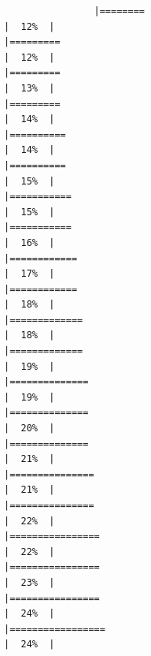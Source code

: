 \documentclass[
]{article}
\begin{document}
\begin{verbatim}
                |========                                                              |  12%  |                                                                              |=========                                                             |  12%  |                                                                              |=========                                                             |  13%  |                                                                              |=========                                                             |  14%  |                                                                              |==========                                                            |  14%  |                                                                              |==========                                                            |  15%  |                                                                              |===========                                                           |  15%  |                                                                              |===========                                                           |  16%  |                                                                              |============                                                          |  17%  |                                                                              |============                                                          |  18%  |                                                                              |=============                                                         |  18%  |                                                                              |=============                                                         |  19%  |                                                                              |==============                                                        |  19%  |                                                                              |==============                                                        |  20%  |                                                                              |==============                                                        |  21%  |                                                                              |===============                                                       |  21%  |                                                                              |===============                                                       |  22%  |                                                                              |================                                                      |  22%  |                                                                              |================                                                      |  23%  |                                                                              |================                                                      |  24%  |                                                                              |=================                                                     |  24%  |                                                               
\end{verbatim}
\end{document}
